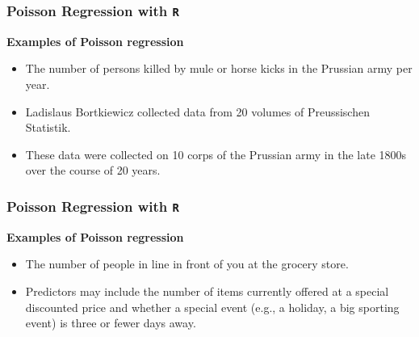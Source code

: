 \documentclass[00-GLMregslides.tex]{subfiles}
\begin{document}
% 

%

\begin{frame}[fragile]

\frametitle{Poisson Regression with \texttt{R} } 
\Large	
\textbf{Examples of Poisson regression} 

\begin{itemize}
\item The number of persons killed by mule or horse kicks in the Prussian army per year. 
\item Ladislaus Bortkiewicz collected data from 20 volumes of Preussischen Statistik. 
\item These data were collected on 10 corps of the Prussian army in the late 1800s over the course of 20 years.
\end{itemize}

\end{frame}
\begin{frame}[fragile]

\frametitle{Poisson Regression with \texttt{R} }
\Large	 
\textbf{Examples of Poisson regression}
\begin{itemize}	
\item The number of people in line in front of you at the grocery store. 
\item Predictors may include the number of items currently offered at a special discounted price and whether a special event (e.g., a holiday, a big sporting event) is three or fewer days away.
\end{itemize}
\end{frame}
\end{document}
